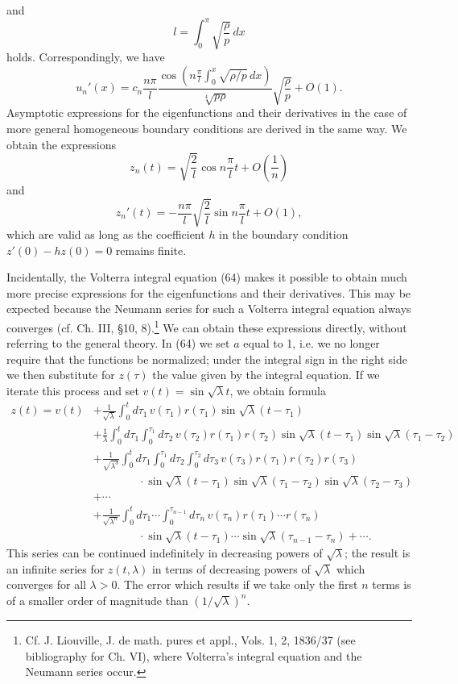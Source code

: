 and
\[
l=\int_0^\pi\sqrt{\frac\rho p}\,dx
\]
holds. Correspondingly, we have
\begin{equation}
u_n'(x)=c_n\frac{n\pi}{l}\frac{\cos\left(n\frac\pi l\int_0^x\sqrt{\rho/p}\,dx\right)}{\sqrt[4]{p\rho}}\sqrt{\frac\rho p}+O(1).
\tag{68}
\end{equation}
Asymptotic expressions for the eigenfunctions and their derivatives in the case of more general homogeneous boundary conditions are derived in the same way. We obtain the expressions
\begin{equation}
z_n(t)=\sqrt{\frac2l}\cos n\frac\pi l t+O\left(\frac1n\right)
\tag{69}
\end{equation}
and
\begin{equation}
z_n'(t)=-\frac{n\pi}{l}\sqrt{\frac2l}\sin n\frac\pi l t+O(1),
\tag{70}
\end{equation}
which are valid as long as the coefficient $h$ in the boundary condition $z'(0)-hz(0)=0$ remains finite.

Incidentally, the Volterra integral equation (64) makes it possible to obtain much more precise expressions for the eigenfunctions and their derivatives. This may be expected because the Neumann series for such a Volterra integral equation always converges (cf. Ch. III, \S10, 8).\footnote{Cf. J. Liouville, J. de math. pures et appl., Vols. 1, 2, 1836/37 (see bibliography for Ch. VI), where Volterra's integral equation and the Neumann series occur.} We can obtain these expressions directly, without referring to the general theory. In (64) we set $a$ equal to 1, i.e. we no longer require that the functions be normalized; under the integral sign in the right side we then substitute for $z(\tau)$ the value given by the integral equation. If we iterate this process and set $v(t)=\sin\sqrt\lambda t$, we obtain formula
\begin{equation}
\begin{aligned}
z(t)=v(t)&+\frac1{\sqrt\lambda}\int_0^t d\tau_1\,v(\tau_1)r(\tau_1)\sin\sqrt\lambda(t-\tau_1)\\
&+\frac1\lambda\int_0^t d\tau_1\int_0^{\tau_1}d\tau_2\,v(\tau_2)r(\tau_1)r(\tau_2)\sin\sqrt\lambda(t-\tau_1)\sin\sqrt\lambda(\tau_1-\tau_2)\\
&+\frac1{\sqrt{\lambda^3}}\int_0^t d\tau_1\int_0^{\tau_1}d\tau_2\int_0^{\tau_2}d\tau_3\,v(\tau_3)r(\tau_1)r(\tau_2)r(\tau_3)\\
&\qquad\qquad\cdot\sin\sqrt\lambda(t-\tau_1)\sin\sqrt\lambda(\tau_1-\tau_2)\sin\sqrt\lambda(\tau_2-\tau_3)\\
&+\cdots\\
&+\frac1{\sqrt{\lambda^n}}\int_0^t d\tau_1\cdots\int_0^{\tau_{n-1}}d\tau_n\,v(\tau_n)r(\tau_1)\cdots r(\tau_n)\\
&\qquad\qquad\cdot\sin\sqrt\lambda(t-\tau_1)\cdots\sin\sqrt\lambda(\tau_{n-1}-\tau_n)+\cdots.
\end{aligned}
\tag{71}
\end{equation}
This series can be continued indefinitely in decreasing powers of $\sqrt\lambda$; the result is an infinite series for $z(t,\lambda)$ in terms of decreasing powers of $\sqrt\lambda$ which converges for all $\lambda>0$. The error which results if we take only the first $n$ terms is of a smaller order of magnitude than $(1/\sqrt\lambda)^n$.


